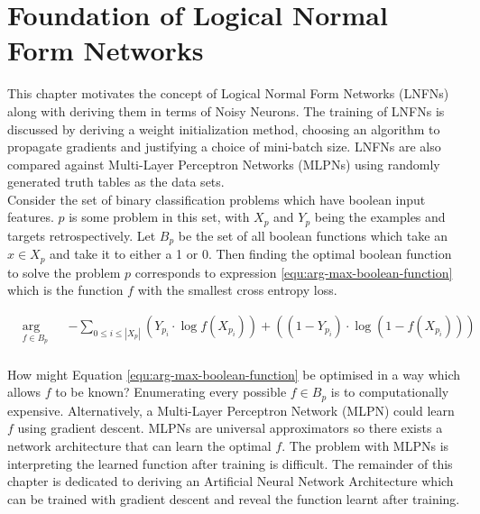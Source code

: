 \chapter{Foundation of Logical Normal Form Networks}\label{C:foundation-of-lnfns}
This chapter motivates the concept of Logical Normal Form Networks (LNFNs) along with deriving them in terms of Noisy Neurons. The training of LNFNs is discussed by deriving a weight initialization method, choosing an algorithm to propagate gradients and justifying a choice of mini-batch size. LNFNs are also compared against Multi-Layer Perceptron Networks (MLPNs) using randomly generated truth tables as the data sets.\\

Consider the set of binary classification problems which have boolean input features. $p$ is some problem in this set, with $X_p$ and $Y_p$ being the examples and targets retrospectively. Let $B_p$ be the set of all boolean functions which take an $x \in X_p$ and take it to either a 1 or 0. Then finding the optimal boolean function to solve the problem $p$ corresponds to expression \ref{equ:arg-max-boolean-function} which is the function $f$ with the smallest cross entropy loss.

\begin{equation}
\label{equ:arg-max-boolean-function}
\begin{aligned}
& \underset{f \in B_p}{\text{arg min}}
& & -\sum_{0 \leq i \leq |X_p|} (Y_{p_i} \cdot \log f(X_{p_i})) + ((1 - Y_{p_i}) \cdot \log(1 - f(X_{p_i})))  \\
\end{aligned}
\end{equation}

How might Equation \ref{equ:arg-max-boolean-function} be optimised in a way which allows $f$ to be known? Enumerating every possible $f \in B_p$ is to computationally expensive. Alternatively, a Multi-Layer Perceptron Network (MLPN) could learn $f$ using gradient descent. MLPNs are universal approximators so there exists a network architecture that can learn the optimal $f$. The problem with MLPNs is interpreting the learned function after training is difficult. The remainder of this chapter is dedicated to deriving an Artificial Neural Network Architecture which can be trained with gradient descent and reveal the function learnt after training.\\

